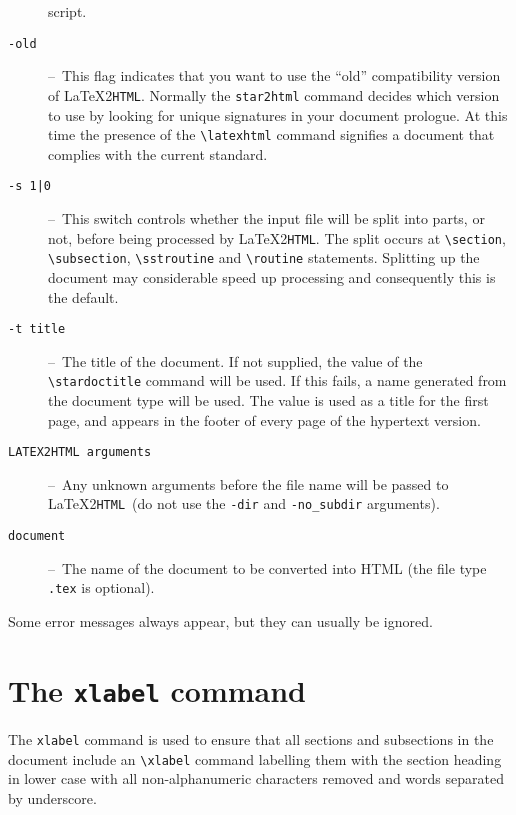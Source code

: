 \documentclass[twoside,11pt]{article}
\newcommand{\stardoctitle}     {Star2HTML\\[1ex]
                                Converting Starlink Documents to Hypertext}
\newcommand{\latexhtml}[2]{#1}
\newcommand{\xlabel}[1]{}
\newcommand{\latextohtml}{\LaTeX2\texttt{HTML}}
\renewcommand{\_}{\texttt{\symbol{95}}}
\newcommand{\dash}{--}
\newcommand{\dash}{-}
\begin{document}
\begin{description}
   script.
\item[\texttt{-old}] \dash\
   This flag indicates that you want to use the ``old''
   compatibility version of \latextohtml. Normally the \verb#star2html#
   command decides which version to use by looking for unique
   signatures in your document prologue. At this time the
   presence of the \verb#\latexhtml# command signifies a document that
   complies with the current standard.
\item[\texttt{-s 1|0}] \dash\
   This switch controls whether the input file will be split
   into parts, or not, before being processed by \latextohtml.
   The split occurs at \verb#\section#, \verb#\subsection#,
   \verb#\sstroutine# and \verb#\routine# statements.
   Splitting up the document may considerable speed up processing and
   consequently this is the default.
\item[\texttt{-t title}] \dash\
   The title of the document.
   If not supplied, the value of the \verb#\stardoctitle# command will be used.
   If this fails, a name generated from the document type will be used.
   The value is used as a title for the first page, and appears in the footer of
   every page of the hypertext version.
\item[\texttt{LATEX2HTML arguments}] \dash\
   Any unknown arguments before the file name will be passed to \latextohtml\
   (do not use the \verb#-dir# and \verb#-no_subdir# arguments).
\item[\texttt{document}] \dash\
   The name of the document to be converted into HTML (the file type
   \texttt{.tex} is optional).

\end{description}

Some error messages always appear, but they can usually be ignored.

\newpage
\section{\xlabel{the_xlabel_command}\label{xlabel}The \texttt{xlabel} command}
The \texttt{xlabel} command is used to ensure that all sections and subsections
in the document include an \verb+\xlabel+ command labelling them with the
section heading in lower case with all non-alphanumeric characters removed and
words separated by underscore.
\end{document}
